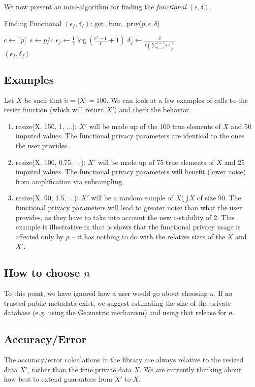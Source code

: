 \documentclass[11pt]{scrartcl} %
\begin{document}
We now present an mini-algorithm for finding the \emph{functional} $(\epsilon, \delta)$.
\begin{algorithm}
    \caption{Finding Functional $(\epsilon_f, \delta_f)$: get\_func\_priv($p, \epsilon, \delta$)}
    \label{alg:finding_functional_privacy}
    \begin{algorithmic}[1]
        \State $c \gets \lceil p \rceil$ 
        \State $s \gets p/c$ 
        \State $\epsilon_{f} \gets \frac{1}{c}\log\left(\frac{e^{\epsilon}-1}{s} + 1\right)$
        \State $\delta_{f} \gets \frac{\delta}{s\left(\sum_{i=1}^{c-1}e^{i \epsilon}\right)}$
        \\ \Return $(\epsilon_{f}, \delta_{f})$ 
    \end{algorithmic}
\end{algorithm}

\subsection{Examples} \label{subsec:examples}
Let $X$ be such that $\tilde{n} = \vert X \vert = 100$. We can look at a few examples of calls to the resize function (which will return $X'$) and check the behavior.
\begin{enumerate}
    \item resize(X, 150, 1, ...): $X'$ will be made up of the 100 true elements of $X$ and 50 imputed values. The functional privacy parameters are identical to the ones the user provides. 
    \item resize(X, 100, 0.75, ...): $X'$ will be made up of 75 true elements of $X$ and 25 imputed values. The functional privacy parameters will benefit (lower noise) from amplification via subsampling.
    \item resize(X, 90, 1.5, ...): $X'$ will be a random sample of $X \bigcup X$ of size 90. 
            The functional privacy parameters will lead to greater noise than what the user provides, as they have to take into account the new c-stability of $2$. 
            This example is illustrative in that is shows that the functional privacy usage is affected only by $p$ -- it has nothing to do with the relative sizes of the $X$ and $X'$.
\end{enumerate}

\subsection{How to choose $n$} \label{subsec:choosing_n}
To this point, we have ignored how a user would go about choosing $n$. If no trusted public metadata exist, we 
suggest estimating the size of the private database (e.g. using the Geometric mechanism) and using that release 
for $n$.  

\subsection{Accuracy/Error}
The accuracy/error calculations in the library are always relative to the resized data $X'$, rather than the true private data $X$. 
We are currently thinking about how best to extend guarantees from $X'$ to $X$.



\end{document}
